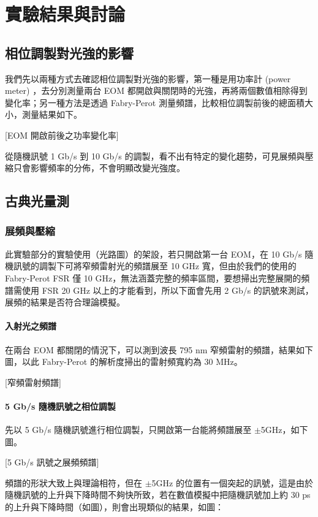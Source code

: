 \documentclass[class=NCU_thesis, crop=false]{standalone}
\begin{document}
\chapter{實驗結果與討論}

\section{相位調製對光強的影響}
我們先以兩種方式去確認相位調製對光強的影響，第一種是用功率計 (power meter) ，去分別測量兩台 EOM 都開啟與關閉時的光強，再將兩個數值相除得到變化率；另一種方法是透過 Fabry-Perot 測量頻譜，比較相位調製前後的總面積大小，測量結果如下。

[EOM 開啟前後之功率變化率]

從隨機訊號 1 Gb/s 到 10 Gb/s 的調製，看不出有特定的變化趨勢，可見展頻與壓縮只會影響頻率的分佈，不會明顯改變光強度。

\section{古典光量測}
\subsection{展頻與壓縮}
此實驗部分的實驗使用（光路圖）的架設，若只開啟第一台 EOM，在 10 Gb/s 隨機訊號的調製下可將窄頻雷射光的頻譜展至 10 GHz 寬，但由於我們的使用的 Fabry-Perot FSR 僅 10 GHz，無法涵蓋完整的頻率區間，要想掃出完整展開的頻譜需使用 FSR 20 GHz 以上的才能看到，所以下面會先用 2 Gb/s 的訊號來測試，展頻的結果是否符合理論模擬。

\subsubsection{入射光之頻譜}
在兩台 EOM 都關閉的情況下，可以測到波長 795 nm 窄頻雷射的頻譜，結果如下圖，以此 Fabry-Perot 的解析度掃出的雷射頻寬約為 30 MHz。

[窄頻雷射頻譜]

\subsubsection{5 Gb/s 隨機訊號之相位調製}
先以 5 Gb/s 隨機訊號進行相位調製，只開啟第一台能將頻譜展至 $\pm$5GHz，如下圖。

[5 Gb/s 訊號之展頻頻譜]

頻譜的形狀大致上與理論相符，但在 $\pm$5GHz 的位置有一個突起的訊號，這是由於隨機訊號的上升與下降時間不夠快所致，若在數值模擬中把隨機訊號加上約 30 ps 的上升與下降時間（如圖），則會出現類似的結果，如圖：
\end{document}
